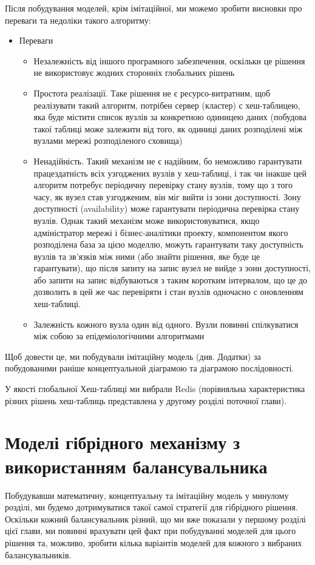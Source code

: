 \documentclass[14pt]{vakthesis}
\begin{document}
Після побудування моделей, крім імітаційної, ми можемо зробити висновки про переваги та недоліки такого алгоритму:

\begin{itemize}
\item Переваги
\begin{itemize}
\item Незалежність від іншого програмного забезпечення, оскільки це рішення не використовує жодних сторонніх  глобальних рішень
\item Простота реалізації. Таке рішення не є ресурсо-витратним, щоб реалізувати такий алгоритм, потрібен сервер (кластер) с хеш-таблицею, яка буде містити список вузлів за конкретною одиницею даних (побудова такої таблиці може залежити від того, як одиниці даних розподілені між вузлами мережі розподіленого сховища)

\end{itemize}
\begin{itemize}
\item Ненадійність. Такий механізм не є надійним, бо неможливо гарантувати працездатність всіх узгоджених вузлів у хеш-таблиці, і так чи інакше цей алгоритм потребує періодичну перевірку стану вузлів, тому що з того часу, як вузел став узгодженим, він міг вийти із зони доступності. Зону доступності (availability) може гарантувати періодична перевірка стану вузлів. Однак такий механізм може використовуватися, якщо адміністратор мережі і бізнес-аналітики проекту, компонентом якого  розподілена база за цією моделлю, можуть гарантувати таку доступність вузлів та зв'язків між ними (або знайти рішення, яке буде це гарантувати), що після запиту на запис вузел не вийде з зони доступності, або запити на запис відбуваються з таким коротким інтервалом, що це до дозволить в цей же час перевіряти і стан вузлів одночасно с оновленням хеш-таблиці.
\item Залежність кожного вузла один від одного. Вузли повинні спілкуватися між собою за епідеміологічними алгоритмами
\end{itemize}
\end{itemize}

Щоб довести це, ми побудували імітаційну модель (див. Додатки) за побудованими раніше концептуальной діаграмою та діаграмою послідовності.

У якості глобальної Хеш-таблиці ми вибрали Redis (порівняльна характеристика різних рішень хеш-таблиць представлена у другому розділі поточної глави).

\section{Моделі гібрідного механізму з використанням балансувальника}
Побудувавши математичну, концептуальну та імітаційну модель у минулому розділі, ми будемо дотримуватися такої самої стратегії для гібрідного рішення.
Оскільки кожний балансувальник різний, що ми вже показали у першому розділі цієї глави, ми повинні врахувати цей факт при побудуванні моделей для цього рішення та, можливо, зробити кілька варіантів моделей для кожного з вибраних балансувальників. 
\end{document}
